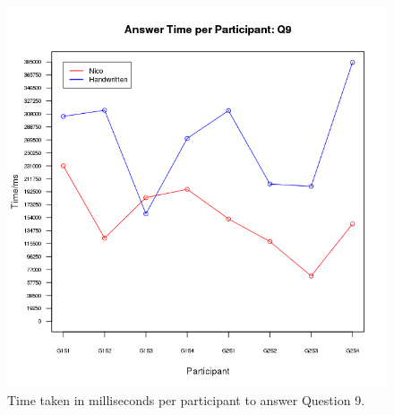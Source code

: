 \documentclass[12pt,twoside,notitlepage,xetex]{report}
\begin{document}
\begin{center}
\begin{figure}[H]
\begin{center}
\includegraphics[height=\textheight/2-2cm]{figs/graphs/q9.png}
\end{center}
\caption{Time taken in milliseconds per participant to answer Question 9.}
\end{figure}
\end{center}
\end{document}
